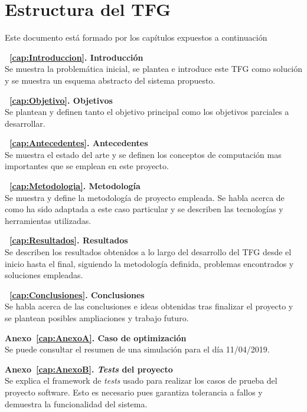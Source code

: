 \section{Estructura del TFG}
Este documento está formado por los capítulos expuestos a continuación
\begin{description}
\item \textbf{~\ref{cap:Introduccion}. Introducción}\\
  Se muestra la problemática inicial, se plantea e introduce este \gls{TFG} como solución y se muestra un esquema abstracto del sistema propuesto.
\item \textbf{~\ref{cap:Objetivo}. Objetivos}\\
  Se plantean y definen tanto el objetivo principal como los objetivos parciales a desarrollar.
\item \textbf{~\ref{cap:Antecedentes}. Antecedentes}\\
  Se muestra el estado del arte y se definen los conceptos de computación mas importantes que se emplean en este proyecto.
\item \textbf{~\ref{cap:Metodologia}. Metodología}\\
  Se muestra y define la metodología de proyecto empleada. Se habla acerca de como ha sido adaptada a este caso particular y se describen las tecnologías y herramientas utilizadas.
\item \textbf{~\ref{cap:Resultados}. Resultados}\\
  Se describen los resultados obtenidos a lo largo del desarrollo del \gls{TFG} desde el inicio hasta el final, siguiendo la metodología definida, problemas encontrados y soluciones empleadas.
\item \textbf{~\ref{cap:Conclusiones}. Conclusiones}\\
  Se habla acerca de las conclusiones e ideas obtenidas tras finalizar el proyecto y se plantean posibles ampliaciones y trabajo futuro.
\item \textbf{Anexo~\ref{cap:AnexoA}. Caso de optimización}\\
  Se puede consultar el resumen de una simulación para el día 11/04/2019.
\item \textbf{Anexo~\ref{cap:AnexoB}. \textit{Tests} del proyecto}\\
  Se explica el framework de \textit{tests} usado para realizar los casos de prueba del proyecto software. Esto es necesario pues garantiza tolerancia a fallos y demuestra la funcionalidad del sistema.
\end{description}
